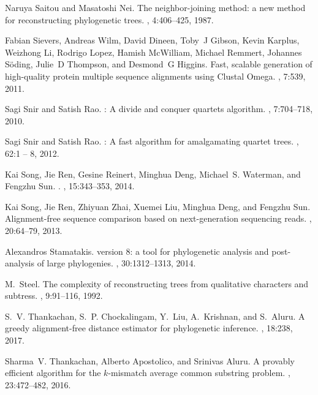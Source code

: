 \documentclass[review]{elsarticle}
\begin{document}
{\begin{thebibliography}{10}
Naruya Saitou and Masatoshi Nei.
\newblock The neighbor-joining method: a new method for reconstructing
  phylogenetic trees.
, 4:406--425, 1987.

Fabian Sievers, Andreas Wilm, David Dineen, Toby~J Gibson, Kevin Karplus,
  Weizhong Li, Rodrigo Lopez, Hamish McWilliam, Michael Remmert, Johannes
  S{\"o}ding, Julie~D Thompson, and Desmond~G Higgins.
\newblock Fast, scalable generation of high-quality protein multiple sequence
  alignments using {Clustal Omega}.
, 7:539, 2011.

Sagi Snir and Satish Rao.
: A divide and conquer quartets algorithm.
, 7:704--718, 2010.

Sagi Snir and Satish Rao.
: A fast algorithm for amalgamating quartet trees.
, 62:1 -- 8, 2012.

Kai Song, Jie Ren, Gesine Reinert, Minghua Deng, Michael~S. Waterman, and
  Fengzhu Sun.
.
, 15:343--353, 2014.

Kai Song, Jie Ren, Zhiyuan Zhai, Xuemei Liu, Minghua Deng, and Fengzhu Sun.
\newblock Alignment-free sequence comparison based on next-generation
  sequencing reads.
, 20:64--79, 2013.

Alexandros Stamatakis.
 version 8: a tool for phylogenetic analysis and post-analysis
  of large phylogenies.
, 30:1312--1313, 2014.

M.~Steel.
\newblock The complexity of reconstructing trees from qualitative characters
  and subtress.
, 9:91--116, 1992.

S.~V. Thankachan, S.~P. Chockalingam, Y.~Liu, A.~Krishnan, and S.~Aluru.
\newblock A greedy alignment-free distance estimator for phylogenetic
  inference.
, 18:238, 2017.

Sharma~V. Thankachan, Alberto Apostolico, and Srinivas Aluru.
\newblock A provably efficient algorithm for the $k$-mismatch average common
  substring problem.
, 23:472--482, 2016.


\end{thebibliography}}
\end{document}
